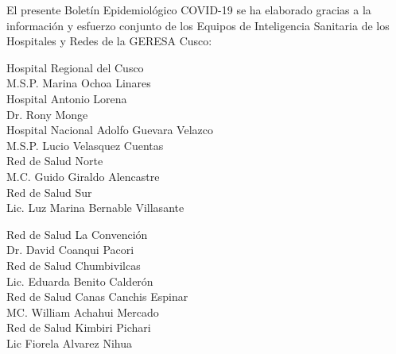 \documentclass[12pt,a4paper,openany]{book}
\begin{document}
	\centering
	{\large El presente Boletín Epidemiológico COVID-19 se ha elaborado gracias a la información y esfuerzo conjunto de los Equipos de Inteligencia Sanitaria de los Hospitales y Redes de la GERESA Cusco:
		
		\vspace{0.5cm}
		\noindent
		\begin{minipage}[t]{.45\textwidth}
			\centering
			Hospital Regional del Cusco \\
			M.S.P. Marina Ochoa Linares \vspace{0.5cm}\\
			Hospital Antonio Lorena \\
			Dr. Rony Monge \vspace{.5cm}\\
			Hospital Nacional Adolfo Guevara Velazco\\
			M.S.P. Lucio Velasquez Cuentas \vspace{.5cm}\\
			Red de Salud Norte \\
			M.C. Guido Giraldo Alencastre\vspace{0.5cm}\\
			Red de Salud Sur\\
			Lic. Luz Marina Bernable Villasante \vspace{0.5cm}\\	
		\end{minipage}
		\hfill
		\noindent
		\begin{minipage}[t]{.45\textwidth}
			\centering
			Red de Salud La Convención\\
			Dr. David Coanqui Pacori\vspace{0.5cm}\\
			Red de Salud Chumbivilcas\\
			Lic. Eduarda Benito Calderón \vspace{.5cm}\\
			Red de Salud Canas Canchis Espinar\\
			MC. William Achahui Mercado \vspace{.5cm}\\
			Red de Salud Kimbiri Pichari \\
			Lic Fiorela Alvarez Nihua\vspace{0.5cm}\\	
		\end{minipage}
}
\end{document}
